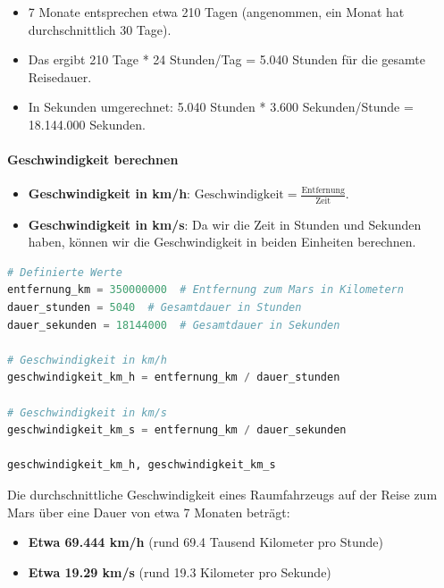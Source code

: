 \documentclass{vorlage-design-main}
\begin{document}
\begin{itemize}

\item
  7 Monate entsprechen etwa 210 Tagen (angenommen, ein Monat hat
  durchschnittlich 30 Tage).
\item
  Das ergibt 210 Tage * 24 Stunden/Tag = 5.040 Stunden für die gesamte
  Reisedauer.
\item
  In Sekunden umgerechnet: 5.040 Stunden * 3.600 Sekunden/Stunde =
  18.144.000 Sekunden.
\end{itemize}

\hypertarget{geschwindigkeit-berechnen}{%
\paragraph{Geschwindigkeit berechnen}\label{geschwindigkeit-berechnen}}

\begin{itemize}

\item
  \textbf{Geschwindigkeit in km/h}:
  $\text{Geschwindigkeit} = \frac{\text{Entfernung}}{\text{Zeit}}$.
\item
  \textbf{Geschwindigkeit in km/s}: Da wir die Zeit in Stunden und
  Sekunden haben, können wir die Geschwindigkeit in beiden Einheiten
  berechnen.
\end{itemize}

\begin{lstlisting}[language=Python]
# Definierte Werte
entfernung_km = 350000000  # Entfernung zum Mars in Kilometern
dauer_stunden = 5040  # Gesamtdauer in Stunden
dauer_sekunden = 18144000  # Gesamtdauer in Sekunden

# Geschwindigkeit in km/h
geschwindigkeit_km_h = entfernung_km / dauer_stunden

# Geschwindigkeit in km/s
geschwindigkeit_km_s = entfernung_km / dauer_sekunden

geschwindigkeit_km_h, geschwindigkeit_km_s
\end{lstlisting}

Die durchschnittliche Geschwindigkeit eines Raumfahrzeugs auf der Reise
zum Mars über eine Dauer von etwa 7 Monaten beträgt:

\begin{itemize}

\item
  \textbf{Etwa 69.444 km/h} (rund 69.4 Tausend Kilometer pro Stunde)
\item
  \textbf{Etwa 19.29 km/s} (rund 19.3 Kilometer pro Sekunde)
\end{itemize}
\end{document}
